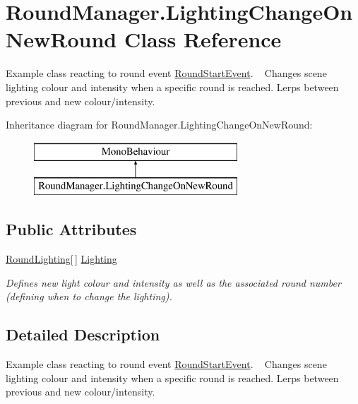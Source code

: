 \hypertarget{class_round_manager_1_1_lighting_change_on_new_round}{}\section{Round\+Manager.\+Lighting\+Change\+On\+New\+Round Class Reference}
\label{class_round_manager_1_1_lighting_change_on_new_round}


Example class reacting to round event \hyperlink{class_round_manager_1_1_events_1_1_round_start_event}{Round\+Start\+Event}. ~\newline
Changes scene lighting colour and intensity when a specific round is reached. Lerps between previous and new colour/intensity.  


Inheritance diagram for Round\+Manager.\+Lighting\+Change\+On\+New\+Round\+:\begin{figure}[H]
\begin{center}
\leavevmode
\includegraphics[height=2.000000cm]{class_round_manager_1_1_lighting_change_on_new_round}
\end{center}
\end{figure}
\subsection*{Public Attributes}
\begin{DoxyCompactItemize}
\item 
\hyperlink{class_round_manager_1_1_round_lighting}{Round\+Lighting}\mbox{[}$\,$\mbox{]} \hyperlink{class_round_manager_1_1_lighting_change_on_new_round_a4c9fddccdd538fdbc361e4843a236282}{Lighting}
\begin{DoxyCompactList}\small\item\em Defines new light colour and intensity as well as the associated round number (defining when to change the lighting). \end{DoxyCompactList}\end{DoxyCompactItemize}


\subsection{Detailed Description}
Example class reacting to round event \hyperlink{class_round_manager_1_1_events_1_1_round_start_event}{Round\+Start\+Event}. ~\newline
Changes scene lighting colour and intensity when a specific round is reached. Lerps between previous and new colour/intensity. 



